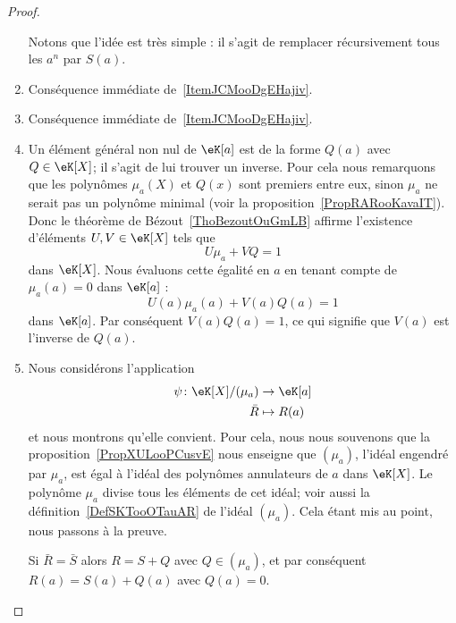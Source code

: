 \begin{proof}
\begin{enumerate}
		      Notons que l'idée est très simple : il s'agit de remplacer récursivement tous les \( a^n\) par \( S(a)\).
		\item
		      Conséquence immédiate de~\ref{ItemJCMooDgEHajiv}.
		\item
		      Conséquence immédiate de~\ref{ItemJCMooDgEHajiv}.
		\item
		      Un élément général non nul de \( \eK[a]\) est de la forme \( Q(a)\) avec \( Q\in\eK[X]\); il s'agit de lui trouver un inverse. Pour cela nous remarquons que les polynômes \( \mu_a(X)\) et \( Q(x)\) sont premiers entre eux, sinon \( \mu_a\) ne serait pas un polynôme minimal (voir la proposition~\ref{PropRARooKavaIT}). Donc le théorème de Bézout~\ref{ThoBezoutOuGmLB} affirme l'existence d'éléments \( U,V\in \eK[X]\) tels que
		      \begin{equation}
			      U\mu_a+VQ=1
		      \end{equation}
		      dans \( \eK[X]\). Nous évaluons cette égalité en \( a\) en tenant compte de \( \mu_a(a)=0\) dans \( \eK[a]\) :
		      \begin{equation}
			      U(a)\mu_a(a)+V(a)Q(a)=1
		      \end{equation}
		      dans \( \eK[a]\). Par conséquent \( V(a)Q(a)=1\), ce qui signifie que \( V(a)\) est l'inverse de \( Q(a)\).
		\item
		      Nous considérons l'application
		      \begin{equation}
			      \begin{aligned}
				      \psi\colon \eK[X]/(\mu_a) & \to \eK[a]   \\
				      \bar R                    & \mapsto R(a)
			      \end{aligned}
		      \end{equation}
		      et nous montrons qu'elle convient. Pour cela, nous nous souvenons que la proposition~\ref{PropXULooPCusvE} nous enseigne que \( (\mu_a)\), l'idéal engendré par \( \mu_a\), est égal à l'idéal des polynômes annulateurs de \( a\) dans \( \eK[X]\). Le polynôme \( \mu_a\) divise tous les éléments de cet idéal; voir aussi la définition~\ref{DefSKTooOTauAR} de l'idéal \( (\mu_a)\). Cela étant mis au point, nous passons à la preuve.
		      \begin{subproof}

			      Si \( \bar R=\bar S\) alors \( R=S+Q\) avec \( Q\in(\mu_a)\), et par conséquent \( R(a)=S(a)+Q(a)\) avec \( Q(a)=0\).

			      \spitem[Surjective]


\end{subproof}
\end{enumerate}
\end{proof}
